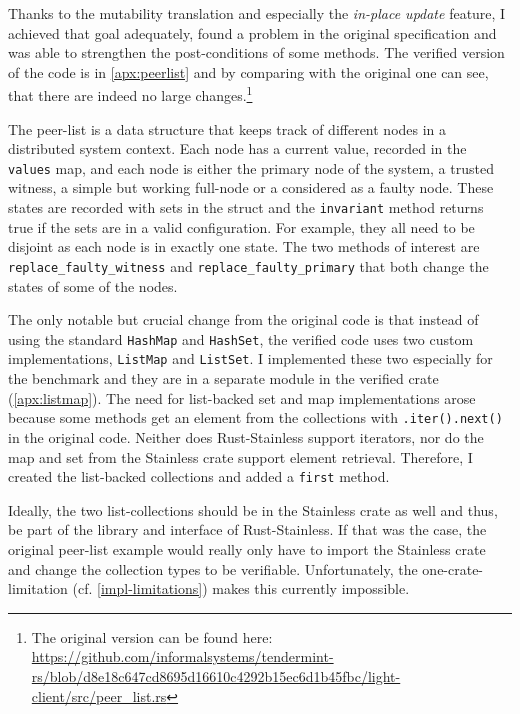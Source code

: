 Thanks to the mutability translation and especially the \emph{in-place update}
feature, I achieved that goal adequately, found a problem in the original
specification and was able to strengthen the post-conditions of some methods.
The verified version of the code is in \autoref{apx:peerlist} and by comparing
with  the original one can see, that there are indeed no large
changes.\footnote{The original version can be found here:
\url{https://github.com/informalsystems/tendermint-rs/blob/d8e18c647cd8695d16610c4292b15ec6d1b45fbc/light-client/src/peer_list.rs}}

The peer-list is a data structure that keeps track of different nodes in a
distributed system context. Each node has a current value, recorded in the
\lstinline!values! map, and each node is either the primary node of the system,
a trusted witness, a simple but working full-node or a considered as a faulty
node. These states are recorded with sets in the struct and the
\lstinline!invariant! method returns true if the sets are in a valid
configuration. For example, they all  need to be disjoint as each node is in
exactly one state. The two methods of interest are
\lstinline!replace_faulty_witness! and \lstinline!replace_faulty_primary! that
both  change the states of some of the nodes.

The only notable but crucial change from the original code is that instead of
using the standard \lstinline!HashMap! and  \lstinline!HashSet!, the verified
code uses two custom implementations, \lstinline!ListMap! and
\lstinline!ListSet!. I implemented these two especially for the benchmark and
they are in a separate module in the verified crate (\autoref{apx:listmap}). The
need for list-backed  set and map implementations arose because some methods get
an element from the collections with \lstinline!.iter().next()! in the original
code. Neither does Rust-Stainless support iterators, nor do the map and set from
the Stainless crate support element retrieval. Therefore, I created the
list-backed collections and added a \lstinline!first! method.

Ideally, the two list-collections should be in the Stainless crate as well and
thus, be part of  the library and interface of Rust-Stainless. If that was the
case, the original peer-list example would really only have to import the
Stainless crate and change  the collection types to be verifiable.
Unfortunately,  the one-crate-limitation (cf. \autoref{impl-limitations}) makes
this currently impossible.


